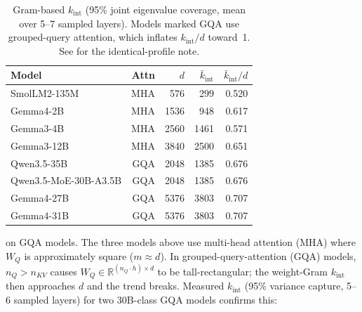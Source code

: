 \documentclass[11pt]{article}
\begin{document}
\begin{table}[h]\centering\small
\caption{Gram-based $k_{\mathrm{int}}$ (95\% joint eigenvalue
coverage, mean over 5--7 sampled layers).  Models marked GQA use
grouped-query attention, which inflates $k_{\mathrm{int}}/d$ toward~1.
See  for the identical-profile note.}
\label{tab:kint-generalise}
\begin{tabular}{@{}lrrrr@{}}
\toprule
Model & Attn & $d$ & $\bar k_{\mathrm{int}}$ & $\bar k_{\mathrm{int}}/d$ \\
\midrule
SmolLM2-135M             & MHA & 576  & 299  & 0.520 \\
Gemma4-2B                & MHA & 1536 & 948  & 0.617 \\
Gemma3-4B                & MHA & 2560 & 1461 & 0.571 \\
Gemma3-12B               & MHA & 3840 & 2500 & 0.651 \\
Qwen3.5-35B              & GQA & 2048 & 1385 & 0.676 \\
Qwen3.5-MoE-30B-A3.5B   & GQA & 2048 & 1385 & 0.676 \\
Gemma4-27B               & GQA & 5376 & 3803 & 0.707 \\
Gemma4-31B               & GQA & 5376 & 3803 & 0.707 \\
\bottomrule
\end{tabular}
\end{table}

\smallskip\noindentNote on GQA models.
The three models above use multi-head attention (MHA) where $W_Q$ is
approximately square ($m\approx d$). In grouped-query-attention (GQA)
models, $n_Q>n_{KV}$ causes $W_Q\!\in\!\mathbb{R}^{(n_Q \cdot h)\times d}$
to be tall-rectangular; the weight-Gram $k_{\mathrm{int}}$ then approaches
$d$ and the trend breaks. Measured $k_{\mathrm{int}}$ (95\% variance capture,
5--6 sampled layers) for two 30B-class GQA models confirms this:
\end{document}
